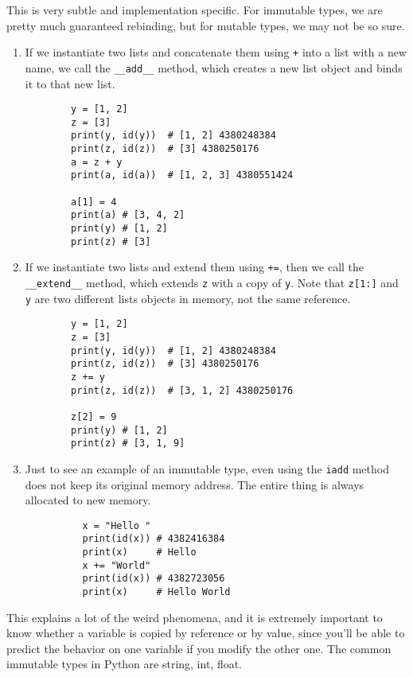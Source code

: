   \begin{example}[Warning]
    This is very subtle and implementation specific. For immutable types, we are pretty much guaranteed rebinding, but for mutable types, we may not be so sure.  
    \begin{enumerate}
      \item If we instantiate two lists and concatenate them using \texttt{+} into a list with a new name, we call the \texttt{\_\_add\_\_} method, which creates a new list object and binds it to that new list.  
      \begin{lstlisting}
        y = [1, 2]
        z = [3]
        print(y, id(y))  # [1, 2] 4380248384
        print(z, id(z))  # [3] 4380250176
        a = z + y
        print(a, id(a))  # [1, 2, 3] 4380551424

        a[1] = 4
        print(a) # [3, 4, 2]
        print(y) # [1, 2]
        print(z) # [3]
      \end{lstlisting}

      \item If we instantiate two lists and extend them using \texttt{+=}, then we call the \texttt{\_\_extend\_\_} method, which extends \texttt{z} with a copy of \texttt{y}. Note that \texttt{z[1:]} and \texttt{y} are two different lists objects in memory, not the same reference. 
      \begin{lstlisting}
        y = [1, 2]
        z = [3]
        print(y, id(y))  # [1, 2] 4380248384
        print(z, id(z))  # [3] 4380250176
        z += y
        print(z, id(z))  # [3, 1, 2] 4380250176

        z[2] = 9
        print(y) # [1, 2]
        print(z) # [3, 1, 9]
      \end{lstlisting}

      \item Just to see an example of an immutable type, even using the \texttt{iadd} method does not keep its original memory address. The entire thing is always allocated to new memory. 
        \begin{lstlisting}
          x = "Hello " 
          print(id(x)) # 4382416384
          print(x)     # Hello
          x += "World"
          print(id(x)) # 4382723056
          print(x)     # Hello World
        \end{lstlisting}
    \end{enumerate}
  \end{example}

  This explains a lot of the weird phenomena, and it is extremely important to know whether a variable is copied by reference or by value, since you'll be able to predict the behavior on one variable if you modify the other one. The common immutable types in Python are string, int, float.


